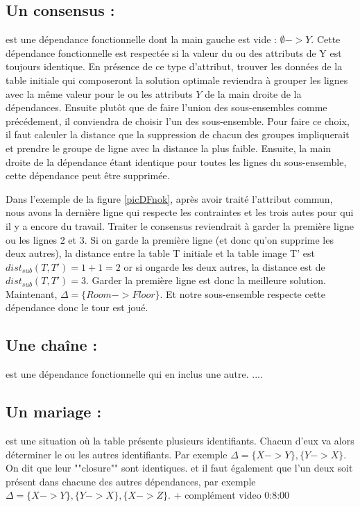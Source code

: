 \documentclass[12pt, a4paper, oneside, titlepage]{book}%
\begin{document}
\subsection{Un consensus : } 
est une dépendance fonctionnelle dont la main gauche est vide : $\emptyset -> Y$. Cette dépendance fonctionnelle est respectée si la valeur du ou des attributs de Y est toujours identique. En présence de ce type d'attribut, trouver les données de la table initiale qui composeront la solution optimale reviendra à grouper les lignes avec la même valeur pour le ou les attributs $Y$ de la main droite de la dépendances. Ensuite plutôt que de faire l'union des sous-ensembles comme précédement, il conviendra de choisir l'un des sous-ensemble. Pour faire ce choix, il faut calculer la distance que la suppression de chacun des groupes impliquerait et prendre le groupe de ligne avec la distance la plus faible. Ensuite, la main droite de la dépendance étant identique pour toutes les lignes du sous-ensemble, cette dépendance peut être supprimée.

Dans l'exemple de la figure \ref{picDFnok}, après avoir traité l'attribut commun, nous avons la dernière ligne qui respecte les contraintes et les trois autes pour qui il y a encore du travail. Traiter le consensus reviendrait à garder la première ligne ou les lignes 2 et 3. Si on garde la première ligne (et donc qu'on supprime les deux autres), la distance entre la table T initiale et la table image T' est $dist_{sub}(T, T') = 1+ 1 = 2$ or si ongarde les deux autres, la distance est de $dist_{sub}(T, T') = 3$. Garder la première ligne est donc la meilleure solution. Maintenant, $\Delta = \{  Room -> Floor \}$. Et notre sous-ensemble respecte cette dépendance donc le tour est joué.

\subsection{Une chaîne : } 
est une dépendance fonctionnelle qui en inclus une autre.
....

\subsection{ Un mariage : }
est une situation où la table présente plusieurs identifiants. Chacun d'eux va alors déterminer le ou les autres identifiants. Par exemple $\Delta = \{  X -> Y \}, \{  Y -> X \}$. On dit que leur ""closure"" sont identiques. et il faut également que l'un deux soit présent dans chacune des autres dépendances, par exemple $\Delta = \{  X -> Y \}, \{  Y -> X \}, \{ X -> Z\}$.
+ complément video 0:8:00
\end{document}
